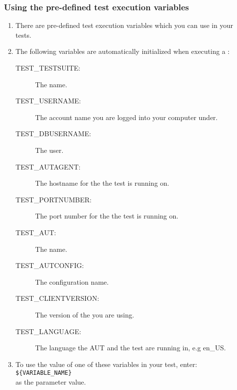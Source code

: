 \subsubsection{Using the  pre-defined test execution variables}
\label{TasksPredefinedVariables}

\begin{enumerate}
\item There are pre-defined test execution variables which you can use in your tests. 
\item The following variables are automatically initialized when executing a \gdsuite{}:
 \begin{description}
 \item [TEST\_TESTSUITE:]{The \gdsuite{} name.}
 \item [TEST\_USERNAME:]{The account name you are logged into your computer under.}
 \item [TEST\_DBUSERNAME:]{The \gddb{} user.}
 \item [TEST\_AUTAGENT:]{The hostname for the \gdagent{} the test is running on.}
 \item [TEST\_PORTNUMBER:]{The port number for the \gdagent{} the test is running on.}
 \item [TEST\_AUT:]{The \gdaut{} name.}
 \item [TEST\_AUTCONFIG:]{The \gdaut{} configuration name.}
 \item [TEST\_CLIENTVERSION:]{The version of the \ite{} you are using.}
 \item [TEST\_LANGUAGE:]{The language the AUT and the test are running in, e.g en\_US. }
 \end{description}
\item To use the value of one of these variables in your test, enter: \\
\verb+${VARIABLE_NAME}+\\
as the parameter value. 
\end{enumerate}

